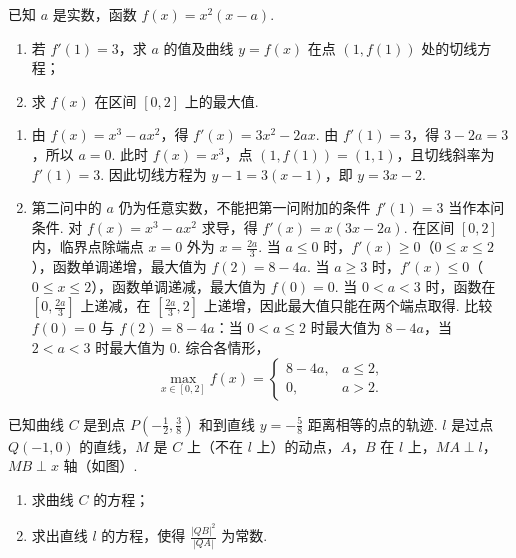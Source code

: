 \begin{problem}
已知 \(a\) 是实数，函数 \(f(x) = x^2 (x - a)\).

\begin{enumerate}
\item 若 \(f'(1)=3\)，求 \(a\) 的值及曲线 \(y=f(x)\) 在点 \((1,f(1))\) 处的切线方程；
\item 求 \(f(x)\) 在区间 \([0,2]\) 上的最大值.
\end{enumerate}
\end{problem}

\begin{solution}
\begin{enumerate}
\item 由 \(f(x)=x^{3}-ax^{2}\)，得 \(f'(x)=3x^{2}-2ax\). 由 \(f'(1)=3\)，得 \(3-2a=3\)，所以 \(a=0\). 此时 \(f(x)=x^{3}\)，点 \((1,f(1))=(1,1)\)，且切线斜率为 \(f'(1)=3\). 因此切线方程为 \(y-1=3(x-1)\)，即 \(y=3x-2\).

\item 第二问中的 \(a\) 仍为任意实数，不能把第一问附加的条件 \(f'(1)=3\) 当作本问条件. 对 \(f(x)=x^3-ax^2\) 求导，得 \(f'(x)=x(3x-2a)\). 在区间 \([0,2]\) 内，临界点除端点 \(x=0\) 外为 \(x=\frac{2a}{3}\). 当 \(a\leqslant0\) 时，\(f'(x)\geqslant0\)（\(0\leqslant x\leqslant2\)），函数单调递增，最大值为 \(f(2)=8-4a\). 当 \(a\geqslant3\) 时，\(f'(x)\leqslant0\)（\(0\leqslant x\leqslant2\)），函数单调递减，最大值为 \(f(0)=0\). 当 \(0<a<3\) 时，函数在 \([0,\frac{2a}{3}]\) 上递减，在 \([\frac{2a}{3},2]\) 上递增，因此最大值只能在两个端点取得. 比较 \(f(0)=0\) 与 \(f(2)=8-4a\)：当 \(0<a\leqslant2\) 时最大值为 \(8-4a\)，当 \(2<a<3\) 时最大值为 \(0\). 综合各情形，
\[
\max_{x\in[0,2]}f(x)=
\begin{cases}
8-4a,&a\leqslant2,\\
0,&a>2.
\end{cases}
\]
\end{enumerate}
\end{solution}

\begin{problem}
已知曲线 \(C\) 是到点 \(P\left(-\frac{1}{2}, \frac{3}{8}\right)\) 和到直线 \(y = -\frac{5}{8}\) 距离相等的点的轨迹. \(l\) 是过点 \(Q(-1, 0)\) 的直线，\(M\) 是 \(C\) 上（不在 \(l\) 上）的动点，\(A\)，\(B\) 在 \(l\) 上，\(MA \perp l\)，\(MB \perp x\) 轴（如图）.

\begin{enumerate}
\item 求曲线 \(C\) 的方程；
\item 求出直线 \(l\) 的方程，使得 \(\frac{|QB|^{2}}{|QA|}\) 为常数.
\end{enumerate}

\end{problem}

